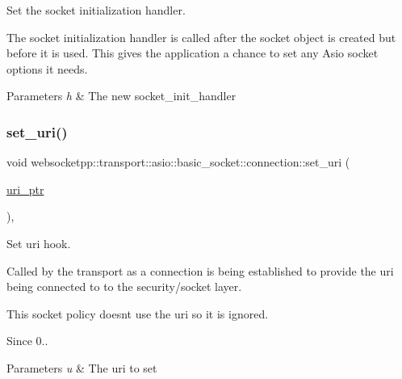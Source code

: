Set the socket initialization handler. 

The socket initialization handler is called after the socket object is created but before it is used. This gives the application a chance to set any Asio socket options it needs.


\begin{DoxyParams}{Parameters}
{\em h} & The new socket\+\_\+init\+\_\+handler \\
\hline
\end{DoxyParams}
\mbox{\label{classwebsocketpp_1_1transport_1_1asio_1_1basic__socket_1_1connection_a303d114dca4ca6ce161fca608e1a7138}} 
\subsubsection{\texorpdfstring{set\+\_\+uri()}{set\_uri()}}
{\footnotesize\ttfamily void websocketpp\+::transport\+::asio\+::basic\+\_\+socket\+::connection\+::set\+\_\+uri (\begin{DoxyParamCaption}\item[{\mbox{\hyperlink{namespacewebsocketpp_aae370ea5ac83a8ece7712cb39fc23f5b}{uri\+\_\+ptr}}}]{ }\end{DoxyParamCaption})\hspace{0.3cm}{\ttfamily [inline]}, {\ttfamily [protected]}}



Set uri hook. 

Called by the transport as a connection is being established to provide the uri being connected to to the security/socket layer.

This socket policy doesn\textquotesingle{}t use the uri so it is ignored.

\begin{DoxySince}{Since}
0..
\end{DoxySince}

\begin{DoxyParams}{Parameters}
{\em u} & The uri to set \\
\hline
\end{DoxyParams}
\mbox{\label{classwebsocketpp_1_1transport_1_1asio_1_1basic__socket_1_1connection_a3ce50f4cb485ca4e98577f9f7af4b635}} 
